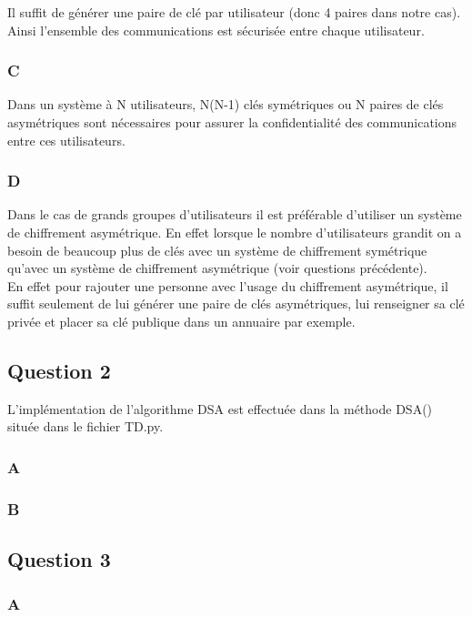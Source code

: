 \documentclass[a4paper, 11pt, oneside]{article}
\begin{document}
Il suffit de générer une paire de clé par utilisateur (donc 4 paires dans notre cas). Ainsi l'ensemble des communications est sécurisée entre chaque utilisateur.

\subsubsection{C}

Dans un système à N utilisateurs, N(N-1) clés symétriques ou N paires de clés asymétriques sont nécessaires pour assurer la confidentialité des communications entre ces utilisateurs.

\subsubsection{D}

Dans le cas de grands groupes d'utilisateurs il est préférable d'utiliser un système de chiffrement asymétrique. En effet lorsque le nombre d'utilisateurs grandit on a besoin de beaucoup plus de clés avec un système de chiffrement symétrique qu'avec un système de chiffrement asymétrique (voir questions précédente).\\
En effet pour rajouter une personne avec l'usage du chiffrement asymétrique,  il suffit seulement de lui générer une paire de clés asymétriques, lui renseigner sa clé privée et placer sa clé publique dans un annuaire par exemple.

\subsection{Question 2}

L'implémentation de l'algorithme DSA est effectuée dans la méthode DSA() située dans le fichier TD.py.

\subsubsection{A}

\subsubsection{B}

\subsection{Question 3}

\subsubsection{A}
\end{document}
